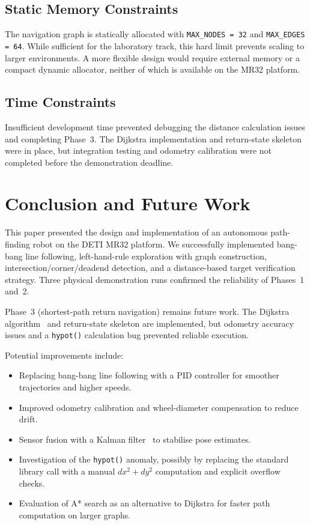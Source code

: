 \documentclass[runningheads]{llncs}
\begin{document}
\subsection{Static Memory Constraints}

The navigation graph is statically allocated with \texttt{MAX\_NODES = 32} and \texttt{MAX\_EDGES = 64}. While sufficient for the laboratory track, this hard limit prevents scaling to larger environments. A more flexible design would require external memory or a compact dynamic allocator, neither of which is available on the MR32 platform.

\subsection{Time Constraints}

Insufficient development time prevented debugging the distance calculation issues and completing Phase~3. The Dijkstra implementation and return-state skeleton were in place, but integration testing and odometry calibration were not completed before the demonstration deadline.

\section{Conclusion and Future Work}\label{sec:conclusion}

This paper presented the design and implementation of an autonomous path-finding robot on the DETI MR32 platform. We successfully implemented bang-bang line following, left-hand-rule exploration with graph construction, intersection/corner/deadend detection, and a distance-based target verification strategy. Three physical demonstration runs confirmed the reliability of Phases~1 and~2.

Phase~3 (shortest-path return navigation) remains future work. The Dijkstra algorithm~\cite{dijkstra1959} and return-state skeleton are implemented, but odometry accuracy issues and a \texttt{hypot()} calculation bug prevented reliable execution.

Potential improvements include:
\begin{itemize}
    \item Replacing bang-bang line following with a PID controller for smoother trajectories and higher speeds.
    \item Improved odometry calibration and wheel-diameter compensation to reduce drift.
    \item Sensor fusion with a Kalman filter~\cite{thrun2005} to stabilise pose estimates.
    \item Investigation of the \texttt{hypot()} anomaly, possibly by replacing the standard library call with a manual $dx^2 + dy^2$ computation and explicit overflow checks.
    \item Evaluation of A* search as an alternative to Dijkstra for faster path computation on larger graphs.
\end{itemize}
\end{document}
